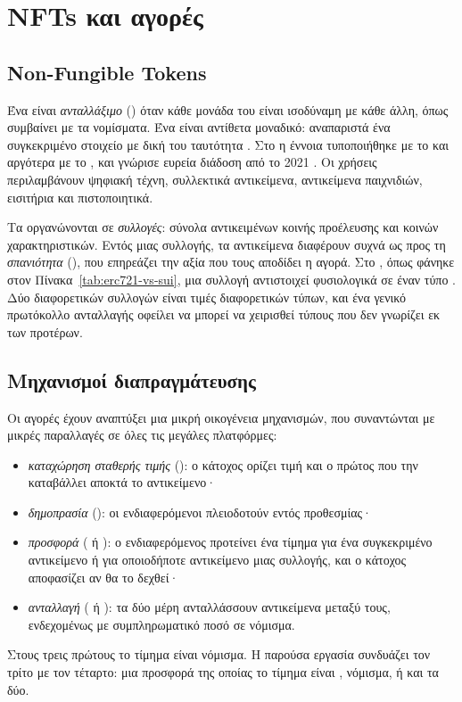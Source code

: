 \section{NFTs και αγορές}
\label{sec:nfts}

\subsection{Non-Fungible Tokens}

Ένα  είναι \emph{ανταλλάξιμο} () όταν κάθε μονάδα του είναι
ισοδύναμη με κάθε άλλη, όπως συμβαίνει με τα νομίσματα. Ένα  είναι
αντίθετα μοναδικό: αναπαριστά ένα συγκεκριμένο στοιχείο με δική του ταυτότητα
\cite{wang2021nft}. Στο  η έννοια τυποποιήθηκε με το 
\cite{erc721} και αργότερα με το  \cite{erc1155}, και γνώρισε ευρεία διάδοση
από το 2021 \cite{nadini2021}. Οι χρήσεις περιλαμβάνουν ψηφιακή τέχνη, συλλεκτικά
αντικείμενα, αντικείμενα παιχνιδιών, εισιτήρια και πιστοποιητικά.

Τα  οργανώνονται σε \emph{συλλογές}: σύνολα αντικειμένων κοινής προέλευσης και
κοινών χαρακτηριστικών. Εντός μιας συλλογής, τα αντικείμενα διαφέρουν συχνά ως προς τη
\emph{σπανιότητα} (), που επηρεάζει την αξία που τους αποδίδει η αγορά. Στο
, όπως φάνηκε στον Πίνακα~\ref{tab:erc721-vs-sui}, μια συλλογή αντιστοιχεί
φυσιολογικά σε έναν τύπο . Δύο  διαφορετικών συλλογών είναι τιμές
διαφορετικών τύπων, και ένα γενικό πρωτόκολλο ανταλλαγής οφείλει να μπορεί να χειρισθεί
τύπους που δεν γνωρίζει εκ των προτέρων.

\subsection{Μηχανισμοί διαπραγμάτευσης}

Οι αγορές  έχουν αναπτύξει μια μικρή οικογένεια μηχανισμών, που συναντώνται με
μικρές παραλλαγές σε όλες τις μεγάλες πλατφόρμες:
\begin{itemize}[nosep]
  \item \emph{καταχώρηση σταθερής τιμής} (): ο κάτοχος ορίζει τιμή και ο πρώτος
        που την καταβάλλει αποκτά το αντικείμενο·
  \item \emph{δημοπρασία} (): οι ενδιαφερόμενοι πλειοδοτούν εντός προθεσμίας·
  \item \emph{προσφορά} ( ή ): ο ενδιαφερόμενος προτείνει ένα τίμημα για
        ένα συγκεκριμένο αντικείμενο ή για οποιοδήποτε αντικείμενο μιας συλλογής, και ο
        κάτοχος αποφασίζει αν θα το δεχθεί·
  \item \emph{ανταλλαγή} ( ή ): τα δύο μέρη ανταλλάσσουν αντικείμενα
        μεταξύ τους, ενδεχομένως με συμπληρωματικό ποσό σε νόμισμα.
\end{itemize}
Στους τρεις πρώτους το τίμημα είναι νόμισμα. Η παρούσα εργασία συνδυάζει τον τρίτο με τον
τέταρτο: μια προσφορά της οποίας το τίμημα είναι , νόμισμα, ή και τα δύο.

